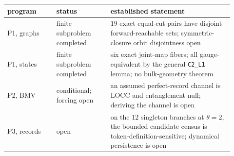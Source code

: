 \begin{center}
\small
\begin{longtable}[]{@{}p{0.2\linewidth}p{0.22\linewidth}p{0.5\linewidth}@{}}
\toprule
program & status & established statement\\
\midrule
\endhead
P1, graphs & finite subproblem completed & \(19\) exact equal-cut pairs have disjoint forward-reachable sets; symmetric-closure
orbit disjointness open\\
P1, states & finite subproblem completed & six exact joint-map fibers; all gauge-equivalent by the general
\texttt{C2\_L1} lemma; no bulk-geometry theorem\\
P2, BMV & conditional; forcing open & an assumed perfect-record channel is LOCC and entanglement-null; deriving the
channel is open\\
P3, records & open & on the \(12\) singleton branches at \(\theta=2\), the bounded candidate census is
token-definition-sensitive; dynamical persistence is open\\
\bottomrule
\end{longtable}
\end{center}
